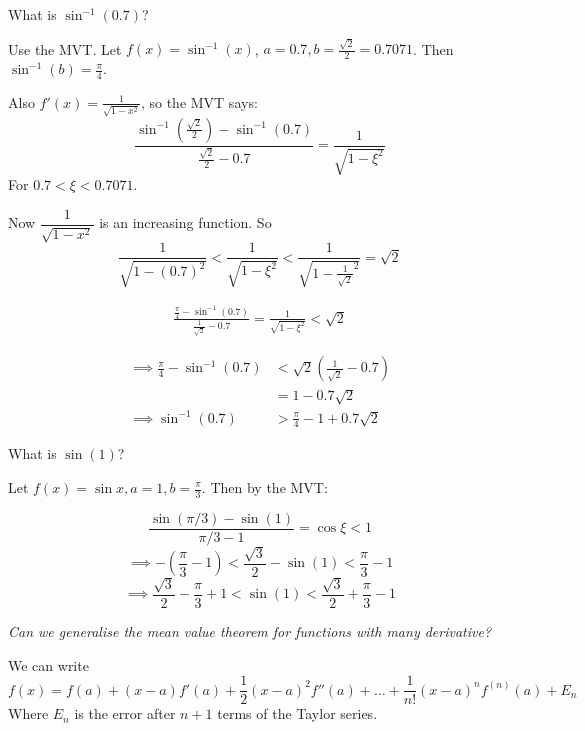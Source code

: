 \documentclass[10pt]{scrartcl}
\begin{document}
\begin{example}
What is $\sin^{-1}(0.7)$? 

Use the MVT. Let $f(x) = \sin^{-1}(x)$, $a = 0.7, b = \frac{\sqrt{2}}{2} = 0.7071$. Then $\sin^{-1}(b) = \frac{\pi}{4}$. 

Also $f'(x) = \frac{1}{\sqrt{1-x^2}}$, so the MVT says: 
\[\frac{\sin^{-1}(\frac{\sqrt{2}}{2}) - \sin^{-1}(0.7)}{\frac{\sqrt{2}}{2} - 0.7} = \frac{1}{\sqrt{1-\xi^2}}\]
For $0.7<\xi < 0.7071$.  

Now $\dfrac{1}{\sqrt{1-x^2}}$ is an increasing function. So 
\[\frac{1}{\sqrt{1-(0.7)^2}} 
< \frac{1}{\sqrt{1-\xi^2}} 
< \frac{1}{\sqrt{1-\frac{1}{\sqrt{2}}^2 }} = \sqrt{2}\]

\[
\begin{aligned}
  \frac{\frac{\pi}{4} - \sin^{-1}(0.7)}{\frac{1}{\sqrt{2}}-0.7} = \frac{1}{\sqrt{1-\xi^2}} < \sqrt{2} 
\end{aligned}
\]

\[\begin{aligned}\implies \frac{\pi}{4}-\sin^{-1}(0.7) &< \sqrt{2}(\textstyle{\frac{1}{\sqrt{2}}} - 0.7)\\
&= 1 - 0.7\sqrt{2}\\[0.2cm]
\implies \sin^{-1}(0.7) &> \frac{\pi}{4} -1 + 0.7\sqrt{2}\end{aligned}\]
\end{example}\vspace*{10pt}

\begin{example}
What is $\sin(1)$?

Let $f(x) = \sin x, a = 1, b = \frac{\pi}{3}$. Then by the MVT: 

\[\frac{\sin(\pi/3) - \sin(1)}{\pi/3 -1} = \cos \xi < 1\]
\[\implies -(\frac{\pi}{3}-1) < \frac{\sqrt{3}}{2} - \sin(1) < \frac{\pi}{3} -1\]
\[\implies \frac{\sqrt{3}}{2} - \frac{\pi}{3} + 1 < \sin(1) < \frac{\sqrt{3}}{2} + \frac{\pi}{3} -1\]	
\end{example}\vspace*{5pt}

\pagebreak

\emph{Can we generalise the mean value theorem for functions with many derivative?} 

We can write
\[f(x) = f(a) + (x-a)f'(a) + \frac{1}{2}(x-a)^2f''(a) +  \dots + \frac{1}{n!}(x-a)^nf^{(n)}(a) + E_n\]
Where $E_n$ is the error after $n+1$ terms of the Taylor series. \\
\end{document}
